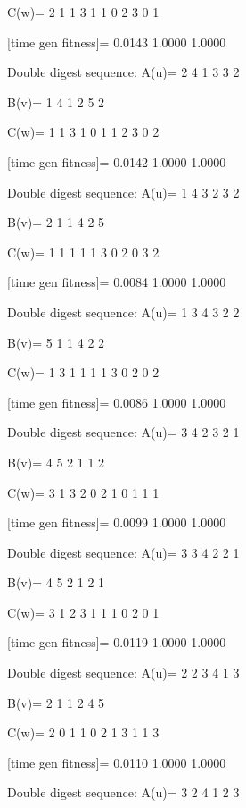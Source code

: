 C(w)=
     2     1     1     3     1     1     0     2     3     0     1

[time gen fitness]=
    0.0143    1.0000    1.0000

Double digest sequence:
A(u)=
     2     4     1     3     3     2

B(v)=
     1     4     1     2     5     2

C(w)=
     1     1     3     1     0     1     1     2     3     0     2

[time gen fitness]=
    0.0142    1.0000    1.0000

Double digest sequence:
A(u)=
     1     4     3     2     3     2

B(v)=
     2     1     1     4     2     5

C(w)=
     1     1     1     1     1     3     0     2     0     3     2

[time gen fitness]=
    0.0084    1.0000    1.0000

Double digest sequence:
A(u)=
     1     3     4     3     2     2

B(v)=
     5     1     1     4     2     2

C(w)=
     1     3     1     1     1     1     3     0     2     0     2

[time gen fitness]=
    0.0086    1.0000    1.0000

Double digest sequence:
A(u)=
     3     4     2     3     2     1

B(v)=
     4     5     2     1     1     2

C(w)=
     3     1     3     2     0     2     1     0     1     1     1

[time gen fitness]=
    0.0099    1.0000    1.0000

Double digest sequence:
A(u)=
     3     3     4     2     2     1

B(v)=
     4     5     2     1     2     1

C(w)=
     3     1     2     3     1     1     1     0     2     0     1

[time gen fitness]=
    0.0119    1.0000    1.0000

Double digest sequence:
A(u)=
     2     2     3     4     1     3

B(v)=
     2     1     1     2     4     5

C(w)=
     2     0     1     1     0     2     1     3     1     1     3

[time gen fitness]=
    0.0110    1.0000    1.0000

Double digest sequence:
A(u)=
     3     2     4     1     2     3

